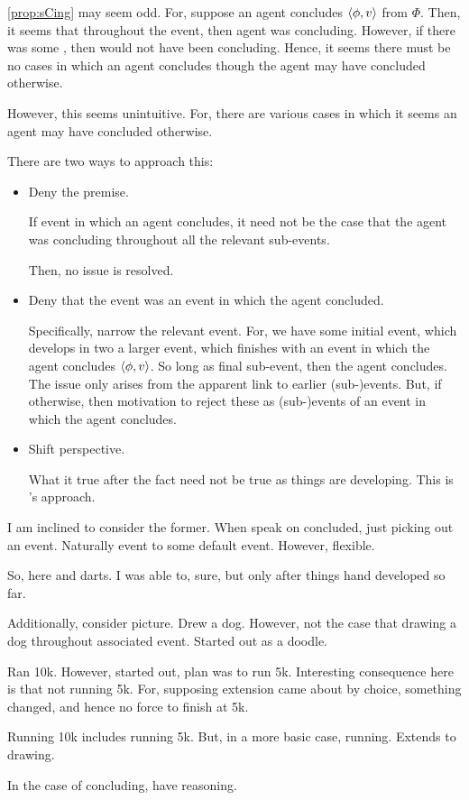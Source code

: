 \begin{note}
  \autoref{prop:sCing} may seem odd.
  For, suppose an agent concludes \(\langle \phi, v \rangle\) from \(\Phi\).
  Then, it seems that throughout the event, then agent was concluding.
  However, if there was some \curb{}, then would not have been concluding.
  Hence, it seems there must be no cases in which an agent concludes though the agent may have concluded otherwise.

  However, this seems unintuitive.
  For, there are various cases in which it seems an agent may have concluded otherwise.

  There are two ways to approach this:
  \begin{itemize}
  \item
    Deny the premise.

    If event in which an agent concludes, it need not be the case that the agent was concluding throughout all the relevant sub-events.

    Then, no issue is resolved.
  \item
    Deny that the event was an event in which the agent concluded.

    Specifically, narrow the relevant event.
    For, we have some initial event, which develops in two a larger event, which finishes with an event in which the agent concludes \(\langle \phi, v \rangle\).
    So long as final sub-event, then the agent concludes.
    The issue only arises from the apparent link to earlier (sub-)events.
    But, if otherwise, then motivation to reject these as (sub-)events of an event in which the agent concludes.
  \item
    Shift perspective.

    What it true after the fact need not be true as things are developing.
    This is \citeauthor{Boylan:2020aa}'s approach.
  \end{itemize}

  I am inclined to consider the former.
  When speak on concluded, just picking out an event.
  Naturally event to some default event.
  However, flexible.

  So, here \citeauthor{Boylan:2020aa} and darts.
  I was able to, sure, but only after things hand developed so far.

  Additionally, consider picture.
  Drew a dog.
  However, not the case that drawing a dog throughout associated event.
  Started out as a doodle.

  Ran 10k.
  However, started out, plan was to run 5k.
  Interesting consequence here is that not running 5k.
  For, supposing extension came about by choice, something changed, and hence no force to finish at 5k.

  Running 10k includes running 5k.
  But, in a more basic case, running.
  Extends to drawing.

  In the case of concluding, have reasoning.
\end{note}

